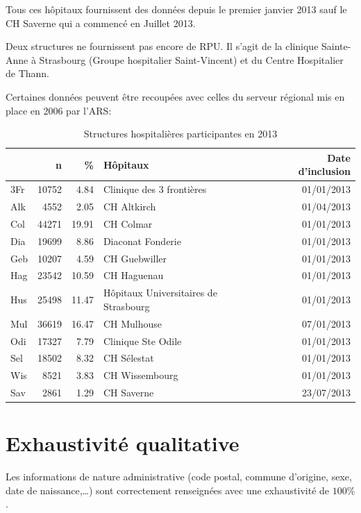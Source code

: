 \documentclass[12pt,english,french,twoside]{report}\usepackage[]{graphicx}\usepackage[]{color}
\begin{document}
Tous ces hôpitaux fournissent des données depuis le premier janvier 2013 sauf le CH Saverne qui a commencé en Juillet 2013.

Deux structures ne fournissent pas encore de RPU. Il s'agit de la clinique Sainte-Anne à Strasbourg (Groupe hospitalier Saint-Vincent) et du Centre Hospitalier de Thann.

Certaines données peuvent être recoupées avec celles du serveur régional mis en place en 2006 par l'ARS: 


\begin{table}[ht]
\centering
\begin{tabular}{|l|r|r|l|r|}
  \hline
 & n & \% & Hôpitaux & Date d'inclusion \\ 
  \hline
3Fr & 10752 & 4.84 & Clinique des 3 frontières & 01/01/2013 \\ 
  Alk & 4552 & 2.05 & CH Altkirch & 01/04/2013 \\ 
  Col & 44271 & 19.91 & CH Colmar & 01/01/2013 \\ 
  Dia & 19699 & 8.86 & Diaconat Fonderie & 01/01/2013 \\ 
  Geb & 10207 & 4.59 & CH Guebwiller & 01/01/2013 \\ 
  Hag & 23542 & 10.59 & CH Haguenau & 01/01/2013 \\ 
  Hus & 25498 & 11.47 & Hôpitaux Universitaires de Strasbourg & 01/01/2013 \\ 
  Mul & 36619 & 16.47 & CH Mulhouse & 07/01/2013 \\ 
  Odi & 17327 & 7.79 & Clinique Ste Odile & 01/01/2013 \\ 
  Sel & 18502 & 8.32 & CH Sélestat & 01/01/2013 \\ 
  Wis & 8521 & 3.83 & CH Wissembourg & 01/01/2013 \\ 
  Sav & 2861 & 1.29 & CH Saverne & 23/07/2013 \\ 
   \hline
\end{tabular}
\caption{Structures hospitalières participantes en 2013} 
\label{tab1}
\end{table}



\section{Exhaustivité qualitative}

Les informations de nature administrative (code postal, commune d'origine, sexe, date de naissance,\dots ) sont correctement renseignées avec une exhaustivité de $100\%$.
\end{document}
